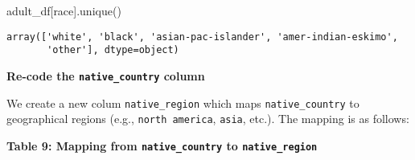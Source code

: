 \documentclass[
  letterpaper,
  DIV=11,
  numbers=noendperiod]{scrartcl}
\newenvironment{Shaded}{\begin{snugshade}}{\end{snugshade}}
\newcommand{\NormalTok}[1]{\textcolor[rgb]{0.00,0.23,0.31}{#1}}
\newcommand{\StringTok}[1]{\textcolor[rgb]{0.13,0.47,0.30}{#1}}
\begin{document}
\begin{Shaded}
\begin{Highlighting}[]
\NormalTok{adult\_df[}\StringTok{\textquotesingle{}race\textquotesingle{}}\NormalTok{].unique()}
\end{Highlighting}
\end{Shaded}

\begin{verbatim}
array(['white', 'black', 'asian-pac-islander', 'amer-indian-eskimo',
       'other'], dtype=object)
\end{verbatim}

\textbf{Re-code the \texttt{native\_country} column}

We create a new colum \texttt{native\_region} which maps
\texttt{native\_country} to geographical regions (e.g.,
\texttt{north\ america}, \texttt{asia}, etc.). The mapping is as
follows:

\textbf{Table 9: Mapping from \texttt{native\_country} to
\texttt{native\_region}}
\end{document}
